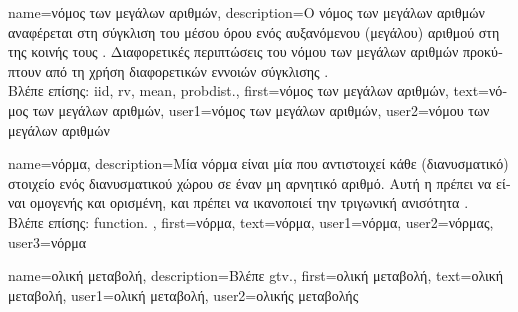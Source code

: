 {name={\foreignlanguage{greek}{νόμος των μεγάλων αριθμών}},
	description={\foreignlanguage{greek}{Ο νόμος των μεγάλων αριθ\-μών} 
		\foreignlanguage{greek}{αναφέρεται στη σύγκλιση του μέσου όρου ενός αυξανόμενου (μεγάλου) αριθ\-μού}  
		  \foreignlanguage{greek}{στη}  \foreignlanguage{greek}{της κοινής τους} 
		. \foreignlanguage{greek}{Διαφορετικές περιπτώσεις του νόμου των μεγάλων αριθμών προκύπτουν από 
		τη χρήση διαφορετικών εννοιών σύγκλισης} \cite{papoulis}.\\
		\foreignlanguage{greek}{Βλέπε επίσης:} \gls{iid}, \gls{rv}, \gls{mean}, \gls{probdist}.},
	first={\foreignlanguage{greek}{νόμος των μεγάλων αριθμών}},
	text={\foreignlanguage{greek}{νόμος των μεγάλων αριθμών}},
	user1={\foreignlanguage{greek}{νόμος των μεγάλων αριθμών}}, %
	user2={\foreignlanguage{greek}{νόμου των μεγάλων αριθμών}} %
}

{name={\foreignlanguage{greek}{νόρμα}},
	description={\foreignlanguage{greek}{Μία νόρμα είναι μία}  
		\foreignlanguage{greek}{που αντιστοιχεί κάθε (διανυσματικό) στοιχείο ενός διανυσματικού χώρου σε έναν μη αρνητικό
		αριθμό. Αυτή η}  \foreignlanguage{greek}{πρέπει να είναι ομογενής και ορισμένη,
		και πρέπει να ικανοποιεί την τριγωνική ανισότητα} \cite{HornMatAnalysis}.\\
		\foreignlanguage{greek}{Βλέπε επίσης:} \gls{function}. },
	first={\foreignlanguage{greek}{νόρμα}},
	text={\foreignlanguage{greek}{νόρμα}},
	user1={\foreignlanguage{greek}{νόρμα}}, %
    	user2={\foreignlanguage{greek}{νόρμας}}, %
	user3={\foreignlanguage{greek}{νόρμα}} %
}

{name={\foreignlanguage{greek}{ολική μεταβολή}}, 
	description={\foreignlanguage{greek}{Βλέπε} \gls{gtv}.},
	first={\foreignlanguage{greek}{ολική μεταβολή}},
	text={\foreignlanguage{greek}{ολική μεταβολή}},
	user1={\foreignlanguage{greek}{ολική μεταβολή}}, %
	user2={\foreignlanguage{greek}{ολικής μεταβολής}} %
}

